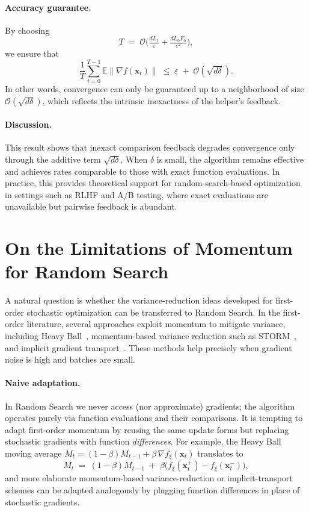 \documentclass[twoside]{article}
\theoremstyle{plain}
\theoremstyle{definition}
\theoremstyle{remark}
\def\cO{{\mathcal{O}}}
\def\vx{{\bm{x}}}
\def\O{{\mathcal{O}}}
\newcommand{\E}{\mathbb{E}}
\begin{document}
\paragraph{Accuracy guarantee.}
By choosing
\[
    T \;=\; \O\!\Big(\tfrac{dL_1}{\varepsilon} + \tfrac{dL_0F_0}{\varepsilon^2}\Big),
\]
we ensure that
\[
    \frac{1}{T}\sum_{t=0}^{T-1}\E\|\nabla f(\vx_t)\|
    \;\leq\; \varepsilon \;+\; \cO(\sqrt{d\delta}).
\]
In other words, convergence can only be guaranteed up to a neighborhood of size
$\cO(\sqrt{d\delta})$, which reflects the intrinsic inexactness of the helper’s
feedback.

\paragraph{Discussion.}
This result shows that inexact comparison feedback degrades convergence only
through the additive term $\sqrt{d\delta}$. When $\delta$ is small, the
algorithm remains effective and achieves rates comparable to those with exact
function evaluations. In practice, this provides theoretical support for
random-search-based optimization in settings such as RLHF and A/B testing,
where exact evaluations are unavailable but pairwise feedback is abundant.


\section{On the Limitations of Momentum for Random Search}

A natural question is whether the variance-reduction ideas developed for
first-order stochastic optimization can be transferred to Random Search. In the
first-order literature, several approaches exploit momentum to mitigate
variance, including Heavy Ball~\cite{polyak1964some}, momentum-based variance
reduction such as STORM~\cite{cutkosky2019momentum}, and implicit gradient
transport~\cite{arnold2019reducing}. These methods help precisely when gradient
noise is high and batches are small.

\paragraph{Naive adaptation.}
In Random Search we never access (nor approximate) gradients; the algorithm
operates purely via function evaluations and their comparisons. It is tempting
to adapt first-order momentum by reusing the same update forms but replacing
stochastic gradients with function \emph{differences}. For example, the Heavy
Ball moving average
\(
  M_t = (1-\beta)M_{t-1} + \beta\,\nabla f_\xi(\vx_t)
\)
translates to
\[
  M_t \;=\; (1-\beta)M_{t-1} \;+\; \beta\big(f_\xi(\vx_t^+) - f_\xi(\vx_t^-)\big),
\]
and more elaborate momentum-based variance-reduction or implicit-transport
schemes can be adapted analogously by plugging function differences in place of
stochastic gradients.
\end{document}
